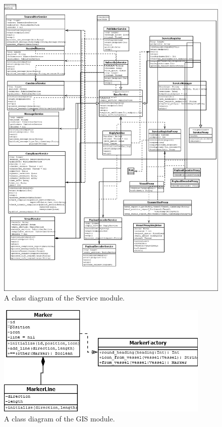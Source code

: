 \documentclass[12pt]{article}
\begin{document}
\begin{figure}
  \centering
  \includegraphics[width=5.5in]{lib_service_total}
  \caption{A class diagram of the Service module.}
  \label{lib_service_total}
\end{figure}

\begin{figure}
  \centering
  \includegraphics[width=4in]{lib_gis_total}
  \caption{A class diagram of the GIS module.}
  \label{lib_gis_total}
\end{figure}
\end{document}
